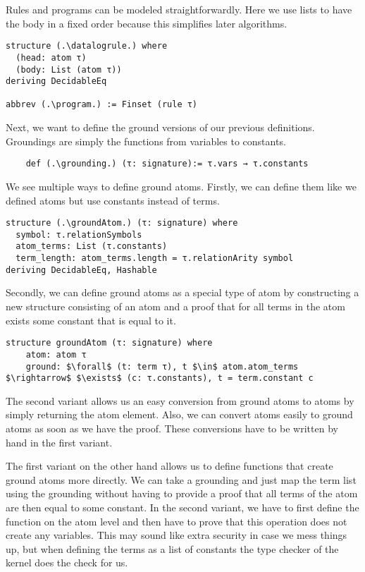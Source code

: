 Rules and programs can be modeled straightforwardly. Here we use lists to have the body in a fixed order because this simplifies later algorithms.

\begin{lstlisting}
structure (.\datalogrule.) where
  (head: atom τ)
  (body: List (atom τ))
deriving DecidableEq

abbrev (.\program.) := Finset (rule τ)
\end{lstlisting}

Next, we want to define the ground versions of our previous definitions. Groundings are simply the functions from variables to constants.

\begin{lstlisting}
    def (.\grounding.) (τ: signature):= τ.vars → τ.constants
\end{lstlisting}

We see multiple ways to define ground atoms. Firstly, we can define them like we defined atoms but use constants instead of terms. 

\begin{lstlisting}
structure (.\groundAtom.) (τ: signature) where
  symbol: τ.relationSymbols
  atom_terms: List (τ.constants)
  term_length: atom_terms.length = τ.relationArity symbol
deriving DecidableEq, Hashable
\end{lstlisting}

Secondly, we can define ground atoms as a special type of atom by constructing a new structure consisting of an atom and a proof that for all terms in the atom exists some constant that is equal to it.

\begin{lstlisting}
structure groundAtom (τ: signature) where
    atom: atom τ
    ground: $\forall$ (t: term τ), t $\in$ atom.atom_terms $\rightarrow$ $\exists$ (c: τ.constants), t = term.constant c
\end{lstlisting}

The second variant allows us an easy conversion from ground atoms to atoms by simply returning the atom element. Also, we can convert atoms easily to ground atoms as soon as we have the proof. These conversions have to be written by hand in the first variant.

The first variant on the other hand allows us to define functions that create ground atoms more directly. We can take a grounding and just map the term list using the grounding without having to provide a proof that all terms of the atom are then equal to some constant. In the second variant, we have to first define the function on the atom level and then have to prove that this operation does not create any variables. This may sound like extra security in case we mess things up, but when defining the terms as a list of constants the type checker of the kernel does the check for us.

